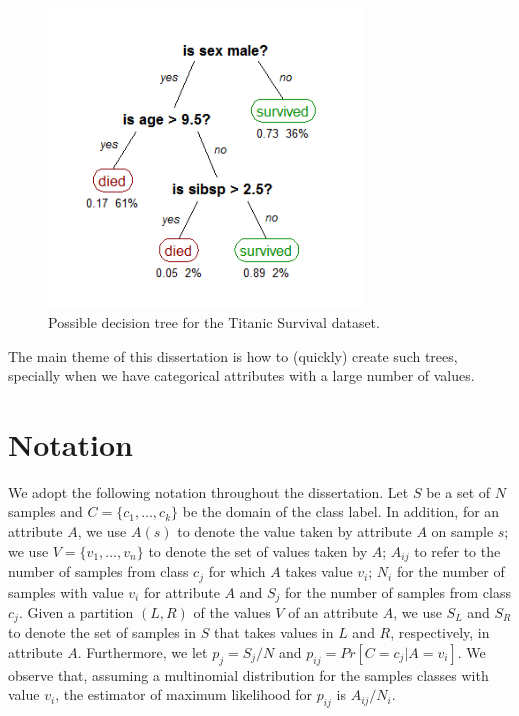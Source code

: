 \begin{figure}[h]
\centering
\includegraphics[width=0.75\textwidth]{titanic-tree}
\caption{Possible decision tree for the Titanic Survival dataset.}
\label{fig:titanic-tree}
\end{figure}

The main theme of this dissertation is how to (quickly) create such trees, specially when we have categorical attributes with a large number of values.

\section{Notation}
\label{sec:notation}
We adopt the following notation throughout the dissertation.
Let $S$ be a set of $N$ samples and 
 $C=\{c_1,\ldots,c_k\}$ be the domain of the class label. 
In addition, for an attribute  $A$, we use $A(s)$ to denote the value taken by attribute
$A$ on sample $s$; we use 
  $V=\{ v_1,\ldots,v_n \}$ to denote the set of values
taken by $A$;
$A_{ij}$ to refer to the  number of samples
from class $c_j$ for which  $A$ takes value $v_i$; 
 $N_i$ for the number of samples with value $v_i$ for attribute $A$
and $S_j$ for the number of samples from class $c_j$.
Given a partition $(L, R)$ of the values $V$ of an attribute $A$, we use $S_L$ and $S_R$
to denote the set of samples in $S$ that takes values in $L$ and $R$, respectively, in attribute $A$.
Furthermore, we let $p_j = S_j/N$ and $p_{ij}= Pr[C=c_j | A = v_i]$.
We observe that, assuming a multinomial distribution for the samples classes with value $v_i$, the estimator of maximum likelihood for $p_{ij}$ is $A_{ij} / N_i$.


